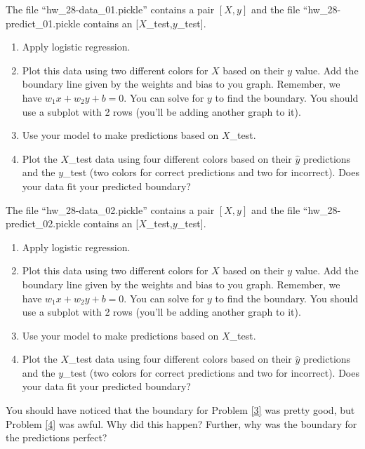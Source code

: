 \documentclass[11pt,letterpaper]{article}
\begin{document}
\begin{problem}
\label{3}
 The file ``hw\_28-data\_01.pickle'' contains a pair $[X,y]$ and the file ``hw\_28-predict\_01.pickle contains an [$X$\_test,$y$\_test].
 \begin{enumerate}
  \item Apply logistic regression.
  \item Plot this data using two different colors for $X$ based on their $y$ value. Add the boundary line given by the weights and bias to you graph. Remember, we have $w_1x+w_2y +b = 0$. You can solve for $y$ to find the boundary. You should use a subplot with 2 rows (you'll be adding another graph to it).
   \item Use your model to make predictions based on $X$\_test.
   \item Plot the $X$\_test data using four different colors based on their $\hat{y}$ predictions and the $y$\_test (two colors for correct predictions and two for incorrect). Does your data fit your predicted boundary?
 \end{enumerate}
\end{problem}




\begin{problem}
\label{4}
 The file ``hw\_28-data\_02.pickle'' contains a pair $[X,y]$ and the file ``hw\_28-predict\_02.pickle contains an [$X$\_test,$y$\_test].
 \begin{enumerate}
  \item Apply logistic regression.
  \item Plot this data using two different colors for $X$ based on their $y$ value. Add the boundary line given by the weights and bias to you graph. Remember, we have $w_1x+w_2y +b = 0$. You can solve for $y$ to find the boundary. You should use a subplot with 2 rows (you'll be adding another graph to it).
  \item Use your model to make predictions based on $X$\_test.
  \item Plot the $X$\_test data using four different colors based on their $\hat{y}$ predictions and the $y$\_test (two colors for correct predictions and two for incorrect). Does your data fit your predicted boundary?
 \end{enumerate}
\end{problem}



\begin{problem}
 You should have noticed that the boundary for Problem \ref{3} was pretty good, but Problem \ref{4} was awful. Why did this happen? Further, why was the boundary for the predictions perfect?
\end{problem}
\end{document}
